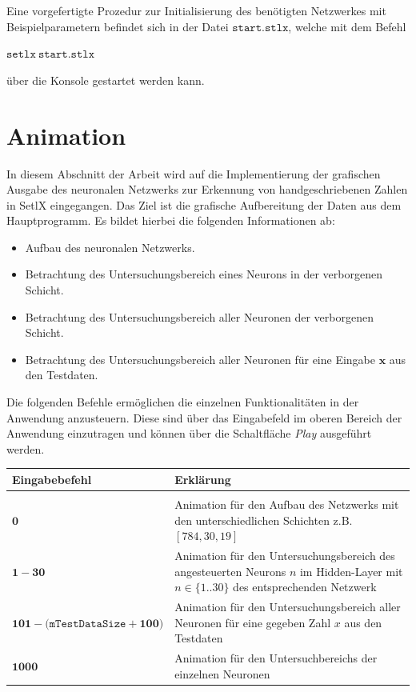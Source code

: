 \noindent
Eine vorgefertigte Prozedur zur Initialisierung des benötigten Netzwerkes mit Beispielparametern befindet sich in der Datei $\mathtt{start.stlx}$, welche mit dem Befehl 
\begin{center}
	$\mathtt{setlx\ start.stlx}$ 
\end{center}
über die Konsole gestartet werden kann.

\section{Animation}
In diesem Abschnitt der Arbeit wird auf die Implementierung der grafischen Ausgabe des neuronalen Netzwerks zur Erkennung von handgeschriebenen Zahlen in SetlX eingegangen. Das Ziel ist die grafische Aufbereitung der Daten aus dem Hauptprogramm. Es bildet hierbei die folgenden Informationen ab: 
\begin{itemize}
\item Aufbau des neuronalen Netzwerks.
\item Betrachtung des Untersuchungsbereich eines Neurons in der verborgenen Schicht.
\item Betrachtung des Untersuchungsbereich aller Neuronen der verborgenen Schicht.
\item Betrachtung des Untersuchungsbereich aller Neuronen für eine Eingabe $\mathbf{x}$ aus den Testdaten.
\end{itemize}
\vspace{0.5cm}
\noindent
Die folgenden Befehle ermöglichen die einzelnen Funktionalitäten in der Anwendung anzusteuern. Diese sind über das Eingabefeld im oberen Bereich der Anwendung einzutragen und können über die Schaltfläche \textit{Play} ausgeführt werden.
\begin{center}
\begin{tabular}{lp{8cm}}
\textbf{Eingabebefehl}   & \textbf{Erklärung} \\
\hline \\
$\mathbf{0}$      & Animation für den Aufbau des Netzwerks mit den unterschiedlichen Schichten z.B. $[784,30,19]$  \\[0.2cm]
$\mathbf{1-30}$   & Animation für den Untersuchungsbereich des angesteuerten Neurons $n$ im Hidden-Layer mit $n \in \{1..30\}$ des entsprechenden Netzwerk  \\[0.2cm]
$\mathbf{101-(\mathtt{mTestDataSize}+100})$  & Animation für den Untersuchungsbereich aller Neuronen für eine gegeben Zahl $x$ aus den Testdaten  \\[0.2cm]
$\mathbf{1000}$   & Animation für den Untersuchbereichs der einzelnen Neuronen  \\
\end{tabular}
\end{center}
\vspace{0.5cm}

